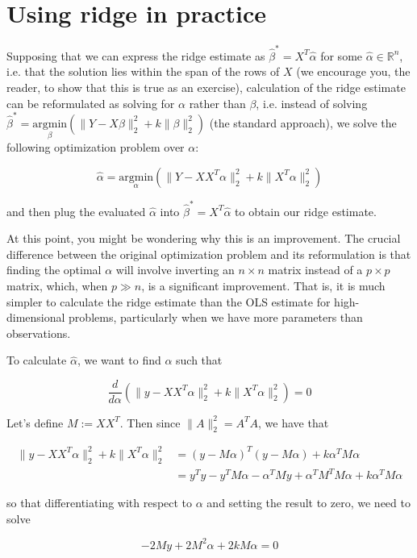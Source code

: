 \section{Using ridge in practice}

Supposing that we can express the ridge estimate as $\hat{\beta}^* = X^T\hat{\alpha}$ for some $\hat{\alpha} \in \mathbb{R}^n$, i.e. that the solution lies within the span of the rows of $X$ (we encourage you, the reader, to show that this is true as an exercise), calculation of the ridge estimate can be reformulated as solving for $\alpha$ rather than $\beta$, i.e. instead of solving $\hat{\beta}^* = \underset{\beta}{\text{argmin}}\left( \|Y - X \beta\|_2^2 + k\|\beta\|_2^2\right)$ (the standard approach), we solve the following optimization problem over $\alpha$:

$$\hat{\alpha} = \underset{\alpha}{\text{argmin}} \left( \|Y - XX^T \alpha\|_2^2 + k \|X^T \alpha\|_2^2\right)$$


and then plug the evaluated $\hat{\alpha}$ into $\hat{\beta}^* = X^T \hat{\alpha}$ to obtain our ridge estimate.

At this point, you might be wondering why this is an improvement. The crucial difference between the original optimization problem and its reformulation is that finding the optimal $\alpha$ will involve inverting an $n \times n$ matrix instead of a $p \times p$ matrix, which, when $p \gg n$,  is a significant improvement. That is, it is much simpler to calculate the ridge estimate than the OLS estimate for high-dimensional problems, particularly when we have more parameters than observations.


To calculate $\hat{\alpha}$, we want to find $\alpha$ such that


$$\frac{d}{d\alpha} \left( \| y - X X^T \alpha \|_2^2 + k \| X^T \alpha \|_2^2 \right) = 0$$

Let's define $M := XX^T$. Then since $\|A\|_2^2 = A^TA$, we have that


\begin{align*}
 \| y - X X^T \alpha \|_2^2 + k \| X^T \alpha \|_2^2 &= (y - M\alpha)^T(y - M \alpha) + k \alpha^TM \alpha\\
 & = y^Ty - y^TM \alpha - \alpha^T M y + \alpha^TM^TM\alpha + k \alpha^TM\alpha
\end{align*}

so that differentiating with respect to $\alpha$ and setting the result to zero, we need to solve

$$-2My + 2M^2 \alpha + 2kM\alpha = 0$$

